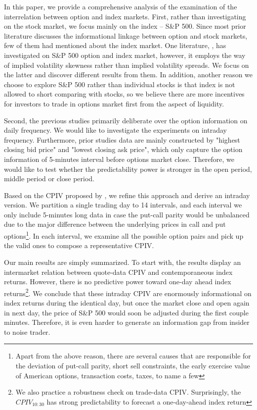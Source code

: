 In this paper, we provide a comprehensive analysis of the examination of the interrelation between option and index markets. First, rather than investigating on the stock market, we focus mainly on the index -- S\&P 500. Since most prior literature discusses the informational linkage between option and stock markets, few of them had mentioned about the index market. One literature, \textcite{atilgan2015implied},  has investigated on S\&P 500 option and index market, however, it employs the way of implied volatility skewness rather than implied volatility spreads. We focus on the latter and discover different results from them. In addition, another reason we choose to explore S\&P 500 rather than individual stocks is that index is not allowed to short comparing with stocks, so we believe there are more incentives for investors to trade in options market first from the aspect of liquidity.

Second, the previous studies primarily deliberate over the option information on daily frequency. We would like to investigate the experiments on intraday frequency. Furthermore, prior studies data are mainly constructed by "highest closing bid price" and "lowest closing ask price", which only capture the option information of 5-minutes interval before options market close. Therefore, we would like to test whether the predictability power is stronger in the open period, middle period or close period.
         
Based on the CPIV proposed by \textcite{cremers2010deviations}, we refine this approach and derive an intraday version. We partition a single trading day to 14 intervals, and each interval we only include 5-minutes long data in case the put-call parity would be unbalanced due to the major difference between the underlying prices in call and put options\footnote{Apart from the above reason, there are several causes that are responsible for the deviation of put-call parity, short sell constraints, the early exercise value of American options, transaction costs, taxes, to name a few}. In each interval, we examine all the possible option pairs and pick up the valid ones to compose a representative CPIV.

Our main results are simply summarized. To start with, the results display an intermarket relation between quote-data CPIV and contemporaneous index returns. However, there is no predictive power toward one-day ahead index returns\footnote{We also practice a robustness check on trade-data CPIV. Surprisingly, the $CPIV_{10:30}$ has strong predictability to forecast a one-day-ahead index return}. We conclude that these intraday CPIV are enormously informational on index returns during the identical day, but once the market close and open again in next day, the price of S\&P 500 would soon be adjusted during the first couple minutes. Therefore, it is even harder to generate an information gap from insider to noise trader.  

